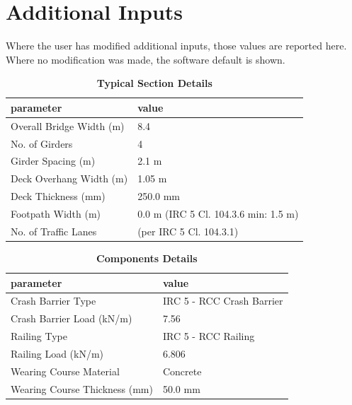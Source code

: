 \documentclass[12pt,a4paper]{report}
\numberwithin{table}{chapter}
\numberwithin{figure}{chapter}
\begin{document}
\newpage
\section{Additional Inputs}
\label{sec:additional-inputs}

Where the user has modified additional inputs, those values are reported here. Where no modification was made, the software default is shown.

\vspace{0.8cm}

\begin{longtable}{|L{5.5cm}|p{10.0cm}|}
\caption{\textbf{Typical Section Details}}\\
\hline
\textbf{parameter} & \textbf{value} \\
\hline
\textnormal{Overall Bridge Width (m)} & 8.4 \\[6pt]
\hline
\textnormal{No. of Girders} & 4 \\[6pt]
\hline
\textnormal{Girder Spacing (m)} & 2.1 m \\[6pt]
\hline
\textnormal{Deck Overhang Width (m)} & 1.05 m \\[6pt]
\hline
\textnormal{Deck Thickness (mm)} & 250.0 mm \\[6pt]
\hline
\textnormal{Footpath Width (m)} & 0.0 m (IRC 5 Cl. 104.3.6 min: 1.5 m) \\[6pt]
\hline
\textnormal{No. of Traffic Lanes} &  (per IRC 5 Cl. 104.3.1) \\[6pt]
\hline
\end{longtable}

\vspace{0.8em}

\begin{longtable}{|L{5.5cm}|p{10.0cm}|}
\caption{\textbf{Components Details}}\\
\hline
\textbf{parameter} & \textbf{value} \\
\hline
\textnormal{Crash Barrier Type} & IRC 5 - RCC Crash Barrier \\[6pt]
\hline
\textnormal{Crash Barrier Load (kN/m)} & 7.56 \\[6pt]
\hline

\textnormal{Railing Type} & IRC 5 - RCC Railing \\[6pt]
\hline
\textnormal{Railing Load (kN/m)} & 6.806 \\[6pt]
\hline
\textnormal{Wearing Course Material} & Concrete \\[6pt]
\hline
\textnormal{Wearing Course Thickness (mm)} & 50.0 mm \\[6pt]
\hline
\end{longtable}
\end{document}
